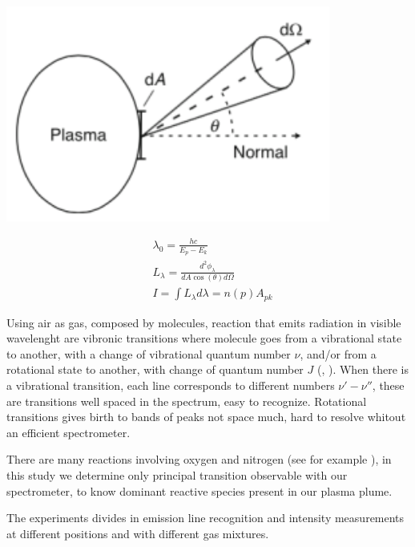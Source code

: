 \begin{minipage}{.45\textwidth}
 \includegraphics[width=0.8\textwidth]{Images/Spectroscopy/plasmaemission.png}
\end{minipage}
\begin{minipage}{.45\textwidth}
\begin{equation}
 \begin{split}
 &\lambda_{0} = \frac{hc}{E_p - E_k} \\
 &L_{\lambda} = \frac{d^2\phi_{\lambda}}{dA \cos(\theta) d\Omega} \\
 &I = \int L_{\lambda} d\lambda = n(p) A_{pk}
 \end{split} 
 \label{eq:emission}
\end{equation}
\end{minipage}

Using air as gas, composed by molecules, reaction that emits radiation in visible wavelenght are vibronic transitions where molecule goes from a vibrational state to another, with a change of vibrational quantum number $\nu$, and/or from a rotational state to another, with change of quantum number $J$ (\cite{book:137793}, \cite{wiki:vibronic}). When there is a vibrational transition, each line corresponds to different numbers $\nu'-\nu''$, these are transitions well spaced in the spectrum, easy to recognize. Rotational transitions gives birth to bands of peaks not space much, hard to resolve whitout an efficient spectrometer.

There are many reactions involving oxygen and nitrogen (see for example \cite{Kossyi_1992}), in this study we determine only principal transition observable with our spectrometer, to know dominant reactive species present in our plasma plume.

The experiments divides in emission line recognition and intensity measurements at different positions and with different gas mixtures.


